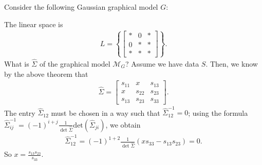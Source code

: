 \begin{eg}
  Consider the following Gaussian graphical model \( G \):
  \begin{figure}[H]
    \centering 
  \end{figure}
  The linear space is 
  \begin{align*}
    L = \left\{ \begin{bmatrix}* & 0 & * \\ 0 & * & * \\ * & * & *\end{bmatrix} \right\}.
  \end{align*}
  What is \( \hat \Sigma \) of the graphical model \( \mathcal{M}_G \)? Assume we have data \( S \). Then, we know by the above theorem that 
  \begin{align*}
    \hat \Sigma = \begin{bmatrix}
      s_{11} &x & s_{13} \\
      x & s_{22} & s_{23} \\
      s_{13} & s_{23} & s_{33}
    \end{bmatrix}.
  \end{align*}
  The entry \( \hat \Sigma_{12} \) must be chosen in a way such that \( \hat \Sigma_{12}^{-1} = 0 \); using the formula \( \hat \Sigma^{-1}_{ij} = (-1)^{i+j} \frac{1}{\det \hat \Sigma} \mathrm{det}(\hat \Sigma_{ji}) \), we obtain 
  \begin{align*}
    \hat \Sigma^{-1}_{12} = (-1)^{1 + 2}\frac{1}{\det \hat \Sigma}(x s_{33} - s_{13}s_{23}) =0.
  \end{align*}
  So \( x =  \frac{s_{13}s_{23}}{s_{33}}\).
\end{eg}